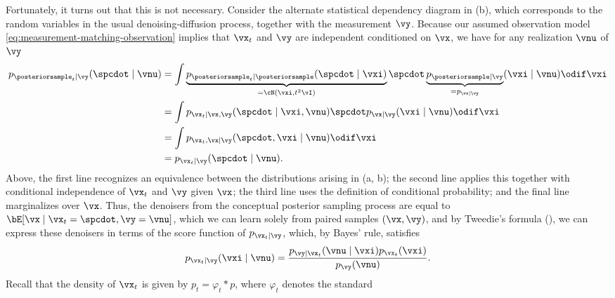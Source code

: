 \documentclass[../../book-main.tex]{subfiles}
\begin{document}
Fortunately, it turns out that this is not necessary.
Consider the alternate statistical dependency diagram in
(b), which corresponds to the random variables
in the usual denoising-diffusion process, together with the measurement $\vy$. 
Because our assumed observation model \eqref{eq:measurement-matching-observation}
implies that $\vx_t$ and $\vy$ are independent conditioned on $\vx$, we have for
any realization $\vnu$ of $\vy$
\begin{align*}
  p_{\posteriorsample_t\mid \vy}(\spcdot \mid \vnu)
  &= \int
  \underbrace{p_{\posteriorsample_t \mid \posteriorsample}(\spcdot\mid \vxi)}_{=
  \cN(\vxi, t^2 \vI)}
  \spcdot \underbrace{p_{\posteriorsample \mid \vy}}_{= p_{\vx\mid \vy}}(\vxi \mid
  \vnu)
  \odif \vxi
  \\
  &=
  \int p_{\vx_t \mid \vx, \vy}(\spcdot\mid \vxi, \vnu) \spcdot p_{\vx \mid
  \vy}(\vxi\mid \vnu) \odif \vxi
  \\
  &=
  \int p_{\vx_t, \vx \mid \vy}(\spcdot, \vxi \mid \vnu) \odif \vxi
  \\
  &= p_{\vx_t \mid \vy}(\spcdot\mid \vnu).
\end{align*}
Above, the first line recognizes an equivalence between the distributions
arising in (a, b); the second line applies this
together with conditional independence of $\vx_t$ and $\vy$ given $\vx$; the
third line uses the definition of conditional probability; and the final line
marginalizes over $\vx$.
Thus, the denoisers from the conceptual posterior sampling process are equal to
$\bE[\vx \mid \vx_t=\spcdot, \vy=\vnu]$, which we can learn solely from paired samples $(\vx,
\vy)$,
and by Tweedie's formula (), we can express these denoisers in
terms of the score function of $p_{\vx_t \mid \vy}$, which, by Bayes' rule,
satisfies
\begin{equation}
  p_{\vx_t \mid \vy}(\vxi \mid \vnu) 
  = \frac{p_{\vy \mid \vx_t}(\vnu \mid \vxi) p_{\vx_t}(\vxi)}{p_{\vy}(\vnu)}.
\end{equation}
Recall that the density of $\vx_t$ is 
given by $p_t = \varphi_{t} \ast p$, where $\varphi_{t}$ denotes the standard
\end{document}
